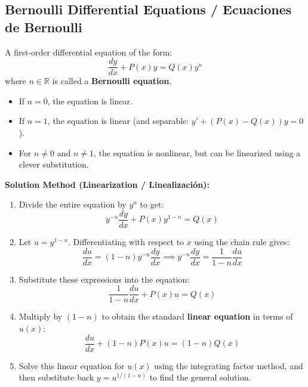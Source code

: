 \documentclass[11pt,letterpaper]{article}
\begin{document}
\subsection{Bernoulli Differential Equations / Ecuaciones de Bernoulli}
A first-order differential equation of the form:
\begin{equation}
    \frac{dy}{dx} + P(x)y = Q(x)y^n
\end{equation}
where $n \in \mathbb{R}$ is called a \textbf{Bernoulli equation}. 
\begin{itemize}
    \item If $n = 0$, the equation is linear.
    \item If $n = 1$, the equation is linear (and separable: $y' + (P(x) - Q(x))y = 0$).
    \item For $n \neq 0$ and $n \neq 1$, the equation is nonlinear, but can be linearized using a clever substitution.
\end{itemize}

\textbf{Solution Method (Linearization / Linealización):}
\begin{enumerate}
    \item Divide the entire equation by $y^n$ to get:
    \begin{equation}
        y^{-n} \frac{dy}{dx} + P(x)y^{1-n} = Q(x)
    \end{equation}
    \item Let $u = y^{1-n}$. Differentiating with respect to $x$ using the chain rule gives:
    \begin{equation}
        \frac{du}{dx} = (1-n)y^{-n} \frac{dy}{dx} \implies y^{-n} \frac{dy}{dx} = \frac{1}{1-n} \frac{du}{dx}
    \end{equation}
    \item Substitute these expressions into the equation:
    \begin{equation}
        \frac{1}{1-n} \frac{du}{dx} + P(x)u = Q(x)
    \end{equation}
    \item Multiply by $(1-n)$ to obtain the standard \textbf{linear equation} in terms of $u(x)$:
    \begin{equation}
        \frac{du}{dx} + (1-n)P(x)u = (1-n)Q(x)
    \end{equation}
    \item Solve this linear equation for $u(x)$ using the integrating factor method, and then substitute back $y = u^{1/(1-n)}$ to find the general solution.
\end{enumerate}
\end{document}
